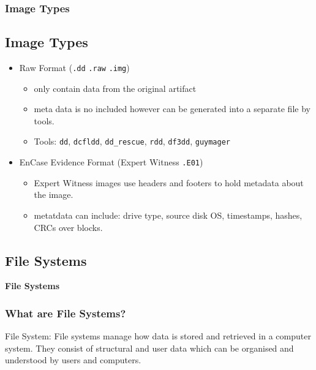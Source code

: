 \documentclass{beamer}
\begin{document}
\begin{frame}
	\frametitle{Image Types}
	\subsection*{Image Types}
	\begin{itemize}
		\item Raw Format (\texttt{.dd} \texttt{.raw} \texttt{.img})
		\begin{itemize}
			\item only contain data from the original artifact
			\item meta data is no included however can be generated into a separate file by tools.
			\item Tools: \texttt{dd}, \texttt{dcfldd}, \texttt{dd\_rescue}, \texttt{rdd}, \texttt{df3dd}, \texttt{guymager}
		\end{itemize}
		\item EnCase Evidence Format (Expert Witness \texttt{.E01})
		\begin{itemize}
			\item Expert Witness images use headers and footers to hold metadata about the image.
			\item metatdata can include: drive type, source disk OS, timestamps, hashes, CRCs over blocks.
		\end{itemize}
	\end{itemize}
\end{frame}

\begin{frame}%
	\section{File Systems}
	\begin{center}
		\Huge\textbf{File Systems}
	\end{center}
\end{frame}

\begin{frame}
	\frametitle{What are File Systems?}
	\begin{block}{File System:}
		File systems manage how data is stored and retrieved in a computer system. They consist of structural and user data which can be organised and understood by users and computers.
	\end{block}
	
		
\end{frame}
\end{document}
